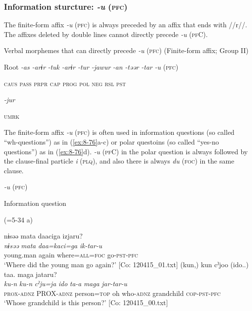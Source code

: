 \subsubsection{Information sturcture: \textit{-u} (\textsc{pfc})}

The finite-form affix \textit{-u} (\textsc{pfc}) is always preceded by an affix that ends with //r//. The affixes deleted by double lines cannot directly precede \textit{-u} (\textsc{pf}C).

\ea\label{ex:8-75}
  Verbal morphemes that can directly precede \textit{-u} (\textsc{pfc}) (Finite-form affix; Group II)

  Root  \textit{-as  -arɨr} %
\textit{-tuk  -arɨr  -tur  -jawur} %
\textit{-an  -təər  -tar  -u} (\textsc{pfc})

    \textsc{caus}  \textsc{pass}  \textsc{prpr}  \textsc{cap}  \textsc{prog}  \textsc{pol}  \textsc{neg}  \textsc{rsl}  \textsc{pst}

          \textit{-jur}

          \textsc{umrk}
\z

The finite-form affix \textit{-u} (\textsc{pfc}) is often used in information questions (so called “wh-questions”) as in (\ref{ex:8-76}a-c) or polar questoins (so called “yes-no questions”) as in (\ref{ex:8-76}d). \textit{-u} (\textsc{pf}C) in the polar question is always followed by the clause-final particle \textit{i} (\textsc{plq}), and also there is always \textit{du} (\textsc{foc}) in the same clause.

\ea\label{ex:8-76}
  \textit{-u} (\textsc{pfc})

  Information question

 (=5-34 a)

{\TM}
\glll  nɨsəə  mata  daaciga  izjaru?\\
\textit{nɨsəə}  \textit{mata}  \textit{daa=kaci=ga}  \textit{ik-tar-u}\\
young.man  again  where=\textsc{all}=\textsc{foc}  go-\textsc{pst}-\textsc{pfc}\\
\glt ‘Where did the young man go again?’ [Co: 120415\_01.txt]
\ex
{\TM}
\glll  (kun,)  kun  cˀjoo  (ido..)  taa.      maga  jataru?      \\
\textit{ku-n}  \textit{ku-n}  \textit{cˀju=ja}  \textit{ido}  \textit{ta-a}      \textit{maga}  \textit{jar-tar-u}      \\
\textsc{prox}-\textsc{adnz}  PROX-\textsc{adnz}  person=\textsc{top}  oh  who-\textsc{adnz}  grandchild  \textsc{cop}-\textsc{pst}-\textsc{pfc}\\
\glt ‘Whose grandchild is this person?’ [Co: 120415\_00.txt]

